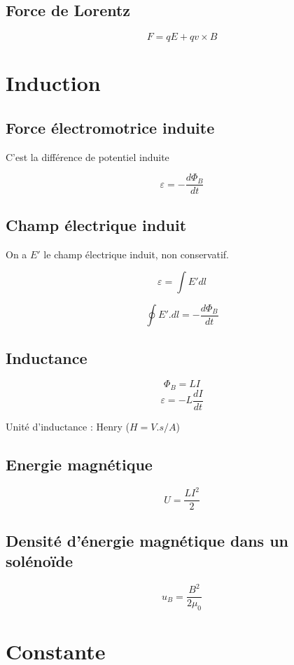 \documentclass[a4paper,10pt,openright,titlepage]{report}
\begin{document}
\subsection{Force de Lorentz}

$$F= qE + qv \times B$$

\section{Induction}

\subsection{Force électromotrice induite}

C'est la différence de potentiel induite

$$\varepsilon = - \frac{d \Phi_B}{dt}$$ 

\subsection{Champ électrique induit}

On a $E'$ le champ électrique induit, non conservatif.

$$\varepsilon = \int E' dl$$

$$\oint E'.dl = -\frac{d\Phi_B}{dt}$$

\subsection{Inductance}

$$\Phi_B = L I$$
$$\varepsilon = - L \frac{dI}{dt}$$

Unité d'inductance : Henry ($H = V.s/A$)

\subsection{Energie magnétique}

$$U = \frac{LI^2}{2}$$

\subsection{Densité d'énergie magnétique dans un solénoïde}

$$u_B = \frac{B^2}{2 \mu_0}$$

\section{Constante}
\end{document}
